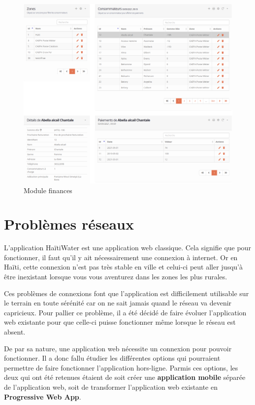 \documentclass{EPL-master-thesis-covers-FR}
\begin{document}
				\begin{figure}[H]
					\centering
					\includegraphics[width=1\textwidth]{images/finances}
					\caption{Module finances}
				\end{figure}
				
				
		\section{Problèmes réseaux}
			L'application HaïtiWater est une application web classique. Cela signifie que pour fonctionner, il faut qu'il y ait nécessairement une connexion à internet. Or en Haïti, cette connexion n'est pas très stable en ville et celui-ci peut aller jusqu'à être inexistant lorsque vous vous aventurez dans les zones les plus rurales. 
			
			Ces problèmes de connexions font que l'application est difficilement utilisable sur le terrain en toute sérénité car on ne sait jamais quand le réseau va devenir capricieux. Pour pallier ce problème, il a été décidé de faire évoluer l'application web existante pour que celle-ci puisse fonctionner même lorsque le réseau est absent.
				
			De par sa nature, une application web nécessite un connexion pour pouvoir fonctionner. Il a donc fallu étudier les différentes options qui pourraient permettre de faire fonctionner l'application hors-ligne. Parmis ces options,  les deux qui ont été retenues étaient de soit créer une \textbf{application mobile} séparée de l'application web, soit de transformer l'application web existante en \textbf{Progressive Web App}. 
				
\end{document}

